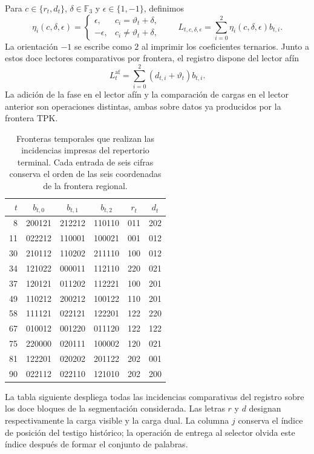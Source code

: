 Para $c\in\{r_t,d_t\}$, $\delta\in\mathbb F_3$ y
$\epsilon\in\{1,-1\}$, definimos
\[
 \eta_i(c,\delta,\epsilon)=
 \begin{cases}
  \epsilon,&c_i=\vartheta_t+\delta,\\
  -\epsilon,&c_i\ne\vartheta_t+\delta,
 \end{cases}
 \qquad
 L_{t,c,\delta,\epsilon}
   =\sum_{i=0}^{2}\eta_i(c,\delta,\epsilon)b_{t,i}.
\]
La orientación $-1$ se escribe como $2$ al imprimir los coeficientes
ternarios. Junto a estos doce lectores comparativos por frontera, el
registro dispone del lector afín
\[
 L^{\mathrm{af}}_t
    =\sum_{i=0}^{2}(d_{t,i}+\vartheta_t)b_{t,i}.
\]
La adición de la fase en el lector afín y la comparación de cargas en
el lector anterior son operaciones distintas, ambas sobre datos ya
producidos por la frontera TPK.

\begin{table}[htbp]
\centering\small
\begin{tabular}{rccc cc}
\toprule
$t$&$b_{t,0}$&$b_{t,1}$&$b_{t,2}$&$r_t$&$d_t$\\
\midrule
8 &200121&212212&110110&011&202\\
11&022212&110001&100021&001&012\\
30&210112&110202&211110&100&012\\
34&121022&000011&112110&220&021\\
37&120121&011202&112221&100&201\\
49&110212&200212&100122&110&201\\
58&111121&022121&122201&122&220\\
67&010012&001220&011120&122&122\\
75&220000&020111&100002&120&021\\
81&122201&020202&201122&202&001\\
90&022112&022110&121010&202&200\\
\bottomrule
\end{tabular}
\caption{Fronteras temporales que realizan las incidencias impresas del
repertorio terminal. Cada entrada de seis cifras conserva el orden de
las seis coordenadas de la frontera regional.}
\label{act21:tab:terminal-bandas-testigo}
\end{table}

La tabla siguiente despliega todas las incidencias comparativas del
registro sobre los doce bloques de la segmentación considerada. Las
letras $r$ y $d$ designan respectivamente la carga visible y la carga
dual. La columna $j$ conserva el índice de posición del testigo histórico;
la operación de entrega al selector olvida este índice después de formar
el conjunto de palabras.

